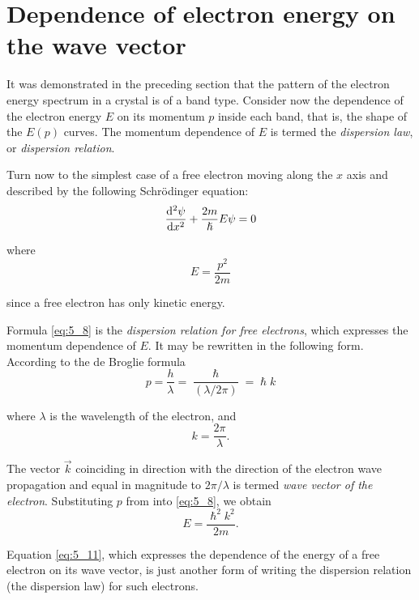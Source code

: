 \section{Dependence of electron energy on the wave vector}\label{sec:40}

It was demonstrated in the preceding section that the pattern of the electron energy spectrum in a crystal is of a band type. Consider now the dependence of the electron energy $E$ on its momentum $p$ inside each band, that is, the shape of the $E(p)$ curves. The momentum dependence of $E$ is termed the \textit{dispersion law}, or \textit{dispersion relation}.

Turn now to the simplest case of a free electron moving along the $x$ axis and described by the following Schr\"odinger equation:
\begin{equation}\label{eq:5_7}
    \dfrac{\mathrm{d}^2\psi}{\mathrm{d} x^2} + \frac{2m}{\hslash} E \psi = 0
\end{equation}

\noindent
where
\begin{equation}\label{eq:5_8}
    E = \frac{p^2}{2m}
\end{equation}

\noindent
since a free electron has only kinetic energy.

Formula \eqref{eq:5_8} is the \textit{dispersion relation for free electrons}, which expresses the momentum dependence of $E$. It may be rewritten in the following form. According to the de Broglie formula
\begin{equation}\label{eq:5_9}
    p = \frac{h}{\lambda} = \frac{\hslash}{(\lambda/2\pi)} = \hslash k
\end{equation}

\noindent
where $\lambda$ is the wavelength of the electron, and
\begin{equation}\label{eq:5_10}
    k = \frac{2\pi}{\lambda}.
\end{equation}

\noindent
The vector $\vec{k}$ coinciding in direction with the direction of the electron wave propagation and equal in magnitude to $2\pi/\lambda$ is termed \textit{wave vector of the electron}. Substituting $p$ from  into \eqref{eq:5_8}, we obtain
\begin{equation}\label{eq:5_11}
    E = \frac{\hslash^2 k^2}{2m}.
\end{equation}

Equation \eqref{eq:5_11}, which expresses the dependence of the energy of a free electron on its wave vector, is just another form of writing the dispersion relation (the dispersion law) for such electrons.

